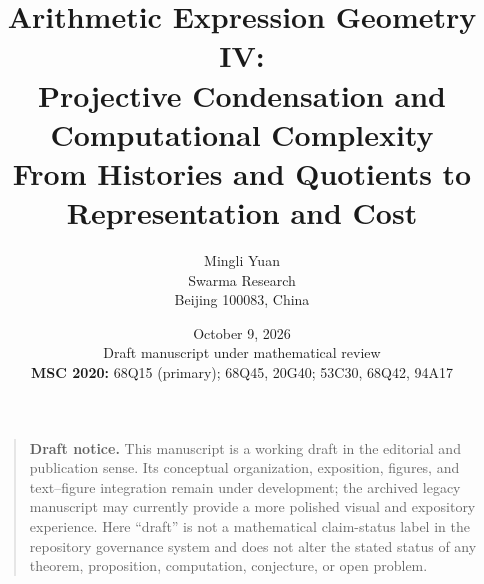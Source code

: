 \documentclass[11pt]{article}
\title{\textbf{Arithmetic Expression Geometry IV:\\Projective Condensation and Computational Complexity}\\[0.45em]
\large From Histories and Quotients to Representation and Cost}
\author{Mingli Yuan\\Swarma Research\\Beijing 100083, China}
\date{October 9, 2026\\[0.25em]
\small Draft manuscript under mathematical review\\[0.35em]
\small
\textbf{MSC 2020:} 68Q15 (primary); 68Q45, 20G40;
53C30, 68Q42, 94A17}
\theoremstyle{definition}
\theoremstyle{remark}
\begin{document}
\maketitle

\begin{quote}\small
\textbf{Draft notice.}
This manuscript is a working draft in the editorial and publication sense.  Its
conceptual organization, exposition, figures, and text--figure integration remain
under development; the archived legacy manuscript may currently provide a more
polished visual and expository experience.  Here ``draft'' is not a mathematical
claim-status label in the repository governance system and does not alter the stated
status of any theorem, proposition, computation, conjecture, or open problem.
\end{quote}
\end{document}

